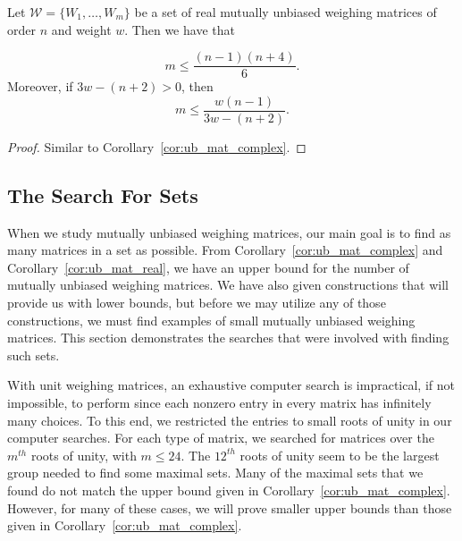 \begin{corollary} \label{cor:ub_mat_real}
 Let $\mathcal{W}=\{W_1,\dots,W_m\}$ be a set of real mutually unbiased weighing matrices of order $n$ and weight $w$. Then we have that

  \begin{equation}\label{eq:aub_mat_real} m \leq \frac{(n-1)(n+4)}{6}.\end{equation}
  Moreover, if $3w-(n+2) > 0$, then
  \begin{equation}\label{eq:tub_mat_real} m \leq \frac{w(n-1)}{3w-(n+2)}.\end{equation}

  \begin{proof}
   Similar to Corollary~\ref{cor:ub_mat_complex}.
  \end{proof}

\end{corollary}

\subsection{The Search For Sets}

When we study mutually unbiased weighing matrices, our main goal is to find as many matrices in a set as possible. From Corollary~\ref{cor:ub_mat_complex} and Corollary~\ref{cor:ub_mat_real}, we have an upper bound for the number of mutually unbiased weighing matrices. We have also given constructions that will provide us with lower bounds, but before we may utilize any of those constructions, we must find examples of small mutually unbiased weighing matrices. This section demonstrates the searches that were involved with finding such sets.


With unit weighing matrices, an exhaustive computer search is impractical, if not impossible, to perform since each nonzero entry in every matrix has infinitely many choices. To this end, we restricted the entries to small roots of unity in our computer searches. For each type of matrix, we searched for matrices over the $m^{th}$ roots of unity, with $m \leq 24$. The $12^{th}$ roots of unity seem to be the largest group needed to find some maximal sets. Many of the maximal sets that we found do not match the upper bound given in Corollary~\ref{cor:ub_mat_complex}. However, for many of these cases, we will prove smaller upper bounds than those given in Corollary~\ref{cor:ub_mat_complex}.

